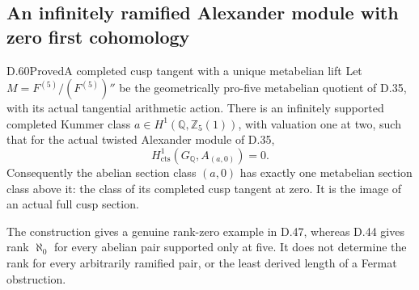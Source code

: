\subsection{An infinitely ramified Alexander module with zero first cohomology}

\begin{statement}{D.60}{Proved}{A completed cusp tangent with a unique metabelian lift}
Let \(M=F^{(5)}/(F^{(5)})''\) be the geometrically pro-five
metabelian quotient of D.35, with its actual tangential arithmetic
action. There is an infinitely supported completed Kummer class
\(a\in H^1(\mathbb Q,\mathbb Z_5(1))\), with valuation one at two,
such that for the actual twisted Alexander module of D.35,
\[
          H^1_{\mathrm{cts}}(G_{\mathbb Q},A_{(a,0)})=0.
                                                        \tag{D.60.1}
\]
Consequently the abelian section class \((a,0)\) has exactly one
metabelian section class above it: the class of its completed cusp
tangent at zero. It is the image of an actual full cusp section.

The construction gives a genuine rank-zero example in D.47, whereas
D.44 gives rank \(\aleph_0\) for every abelian pair supported only
at five. It does not determine the rank for every arbitrarily
ramified pair, or the least derived length of a Fermat obstruction.
\end{statement}

